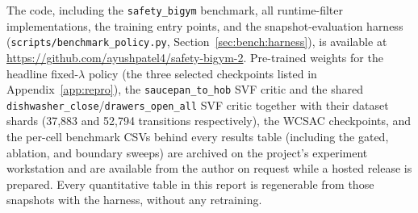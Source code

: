 \documentclass[11pt,a4paper]{report}
\newcommand{\sbigym}{\texttt{safety\_bigym}}
\begin{document}
The code, including the \sbigym{} benchmark, all runtime-filter
implementations, the training entry points, and the
snapshot-evaluation harness
(\texttt{scripts/benchmark\_policy.py},
Section~\ref{sec:bench:harness}), is available at
\url{https://github.com/ayushpatel4/safety-bigym-2}. Pre-trained weights for
the headline fixed-$\lambda$ policy (the three selected checkpoints
listed in Appendix~\ref{app:repro}), the \texttt{saucepan\_to\_hob}
SVF critic and the shared \texttt{dishwasher\_close}/\texttt{drawers\_open\_all}
SVF critic together with their dataset shards
(37{,}883 and 52{,}794 transitions respectively), the WCSAC
checkpoints, and the per-cell benchmark CSVs behind every results
table (including the gated, ablation, and boundary sweeps) are
archived on the project's experiment workstation and are available
from the author on request while a hosted release is prepared. Every
quantitative table in this report is regenerable from those
snapshots with the harness, without any retraining. 

\end{document}
